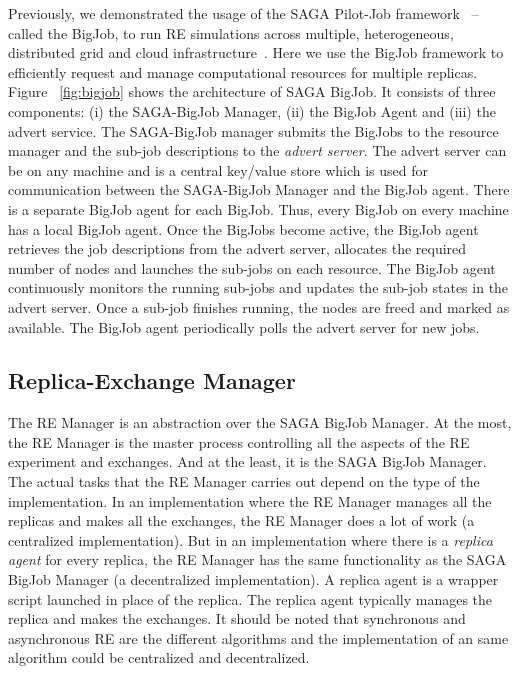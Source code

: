 \documentclass{rspublic}
\newcommand{\jhanote}[1]{ {\textcolor{red} { ***shantenu: #1 }}}
\newcommand{\athotanote}[1]{ {\textcolor{green} { ***athota: #1 }}}
\newcommand{\athotanote}[1]{}
\newcommand{\jhanote}[1]{}
\begin{document}
Previously, we demonstrated the usage of the SAGA Pilot-Job
framework~\citep{saga_bigjob_condor_cloud} -- called the BigJob, to
run RE simulations across multiple, heterogeneous, distributed grid
and cloud infrastructure~\citep{Luckow:2008fp}. Here we use the BigJob
framework to efficiently request and manage computational resources
for multiple replicas.  Figure ~\ref{fig:bigjob} shows the
architecture of SAGA BigJob.  It consists of three components: (i) the
SAGA-BigJob Manager, (ii) the BigJob Agent and (iii) the advert
service. The SAGA-BigJob manager submits the BigJobs to the resource
manager and the sub-job descriptions to the \emph{advert server}. The
advert server can be on any machine and is a central key/value store
which is used for communication between the SAGA-BigJob Manager and
the BigJob agent. There is a separate BigJob agent for each
BigJob. Thus, every BigJob on every machine has a local BigJob
agent. Once the BigJobs become active, the BigJob agent retrieves the
job descriptions from the advert server, allocates the required number
of nodes and launches the sub-jobs on each resource. The BigJob agent
continuously monitors the running sub-jobs and updates the sub-job
states in the advert server. Once a sub-job finishes running, the
nodes are freed and marked as available. The BigJob agent periodically
polls the advert server for new jobs.

\subsection{Replica-Exchange Manager}\label{repexmanager} 

  
  
The RE Manager is an abstraction over the SAGA BigJob Manager. At the most, the RE Manager is the master process controlling all the aspects of the RE experiment and exchanges. And at the least, it is the SAGA BigJob Manager. The actual tasks that the RE Manager carries out depend on the type of the implementation. In an implementation where the RE Manager manages all the replicas and makes all the exchanges, the RE Manager does a lot of work (a centralized implementation). But in an implementation where there is a \emph{replica agent} for every replica, the RE Manager has the same functionality as the SAGA BigJob Manager (a decentralized implementation). A replica agent is a wrapper script launched in place of the replica. The replica agent typically manages the replica and makes the exchanges. It should be noted that synchronous and asynchronous RE are the different algorithms and the implementation of an same algorithm could be centralized and decentralized.
\end{document}
